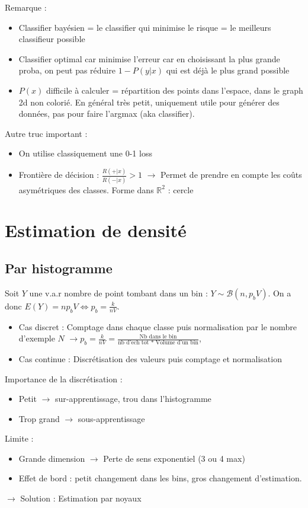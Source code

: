 \documentclass{article}
\begin{document}
\begin{multicols}{2}
Remarque : 
\begin{itemize}
    \item Classifier bayésien = le classifier qui minimise le risque = le meilleurs classifieur possible
    \item Classifier optimal car minimise l'erreur car en choisissant la plus grande proba, on peut pas réduire $ 1 - P(y | x) $ qui est déjà le plus grand possible  
    \item $ P(x) $ difficile à calculer = répartition des points dans l'espace, dans le graph 2d non colorié. En général très petit, uniquement utile pour générer des données, pas pour faire l'argmax (aka classifier).
\end{itemize}
Autre truc important : 
\begin{itemize}
    \item On utilise classiquement une 0-1 loss
    \item Frontière de décision : $ \frac{R(+|x)}{R(-|x)} > 1 $  $\rightarrow$ Permet de prendre en compte les coûts asymétriques des classes. Forme dans $ \mathbb{R}^2 $ : cercle
\end{itemize}

\section{Estimation de densité}
\subsection{Par histogramme}

\begin{defn}
    Soit $ Y $ une v.a.r nombre de point tombant dans un bin : $ Y \sim \mathcal{B}(n, p_b V)$. On a donc $ E(Y) = n p_b V \Leftrightarrow p_b = \frac{k}{nV} $. 
    \begin{itemize}
        \item Cas discret : Comptage dans chaque classe puis normalisation par le nombre d'exemple $ N $ $\rightarrow p_b = \frac{k}{nV} = \frac{\text{Nb dans le bin}}{\text{nb d'ech tot }*\text{ Volume d'un bin}}$,
        \item Cas continue : Discrétisation des valeurs puis comptage et normalisation
    \end{itemize}
\end{defn}
Importance de la discrétisation : \begin{itemize}
    \item Petit $\rightarrow$ sur-apprentissage, trou dans l'histogramme
    \item Trop grand $\rightarrow$ sous-apprentissage
\end{itemize}
Limite : \begin{itemize}
    \item Grande dimension $\rightarrow$ Perte de sens exponentiel (3 ou 4 max)
    \item Effet de bord : petit changement dans les bins, gros changement d'estimation. 
\end{itemize}
$\rightarrow$ Solution : Estimation par noyaux


\end{multicols}
\end{document}
